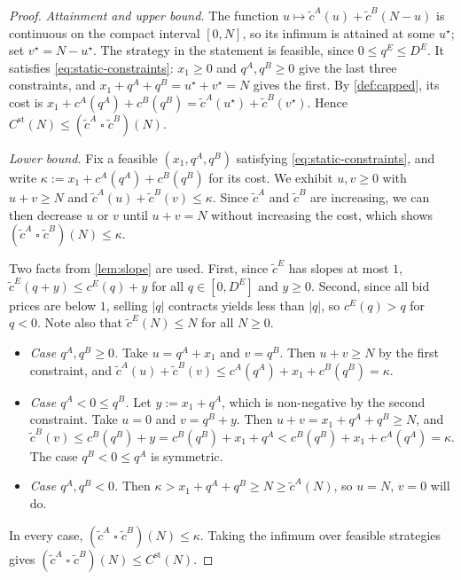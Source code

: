 \documentclass[11pt,a4paper]{article}
\theoremstyle{plain}
\theoremstyle{definition}
\theoremstyle{remark}
\newcommand{\1}{\mathbf{1}}
\newcommand{\infconv}{\mathbin{\square}}
\begin{document}
\begin{proof}
\emph{Attainment and upper bound.} The function $u\mapsto\tilde c^A(u)+\tilde c^B(N-u)$ is continuous on the compact interval $[0,N]$, so its infimum is attained at some $u^\star$; set $v^\star = N-u^\star$. The strategy in the statement is feasible, since $0\leq q^E\leq D^E$. It satisfies \eqref{eq:static-constraints}: $x_1\geq 0$ and $q^A,q^B\geq 0$ give the last three constraints, and $x_1 + q^A + q^B = u^\star + v^\star = N$ gives the first. By \cref{def:capped}, its cost is $x_1 + c^A(q^A) + c^B(q^B) = \tilde c^A(u^\star) + \tilde c^B(v^\star)$. Hence $C^{\mathrm{st}}(N)\leq(\tilde c^A\infconv\tilde c^B)(N)$.

\emph{Lower bound.} Fix a feasible $(x_1,q^A,q^B)$ satisfying \eqref{eq:static-constraints}, and write $\kappa := x_1 + c^A(q^A) + c^B(q^B)$ for its cost. We exhibit $u,v\geq 0$ with $u+v\geq N$ and $\tilde c^A(u)+\tilde c^B(v)\leq\kappa$. Since $\tilde c^A$ and $\tilde c^B$ are increasing, we can then decrease $u$ or $v$ until $u+v=N$ without increasing the cost, which shows $(\tilde c^A\infconv\tilde c^B)(N)\leq\kappa$.

Two facts from \cref{lem:slope} are used. First, since $\tilde c^E$ has slopes at most $1$, $\tilde c^E(q+y)\leq c^E(q)+y$ for all $q\in[0,D^E]$ and $y\geq 0$. Second, since all bid prices are below $1$, selling $|q|$ contracts yields less than $|q|$, so $c^E(q)>q$ for $q<0$. Note also that $\tilde c^E(N)\leq N$ for all $N\geq 0$.
\begin{itemize}
  \item \emph{Case $q^A,q^B\geq 0$.} Take $u = q^A + x_1$ and $v = q^B$. Then $u+v\geq N$ by the first constraint, and $\tilde c^A(u)+\tilde c^B(v)\leq c^A(q^A) + x_1 + c^B(q^B) = \kappa$.
  \item \emph{Case $q^A<0\leq q^B$.} Let $y := x_1 + q^A$, which is non-negative by the second constraint. Take $u=0$ and $v = q^B + y$. Then $u+v = x_1+q^A+q^B\geq N$, and $\tilde c^B(v)\leq c^B(q^B) + y = c^B(q^B) + x_1 + q^A < c^B(q^B) + x_1 + c^A(q^A) = \kappa$. The case $q^B<0\leq q^A$ is symmetric.
  \item \emph{Case $q^A,q^B<0$.} Then $\kappa > x_1 + q^A + q^B\geq N\geq\tilde c^A(N)$, so $u=N$, $v=0$ will do.
\end{itemize}
In every case, $(\tilde c^A\infconv\tilde c^B)(N)\leq\kappa$. Taking the infimum over feasible strategies gives $(\tilde c^A\infconv\tilde c^B)(N)\leq C^{\mathrm{st}}(N)$.
\end{proof}
\end{document}
